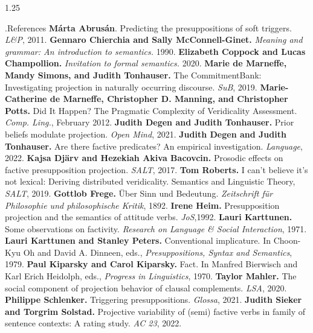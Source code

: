 \documentclass[final, table]{beamer}
\newlength{\colwidth}
\begin{document}
\begin{frame}[t]
\begin{columns}[t]
\begin{column}{1.25\colwidth}
\begin{normalbox}{\phantom.\hfill References}
				\textbf{Márta Abrusán}. Predicting the presuppositions of soft triggers. \textit{L\&P}, 2011.\quad\textbullet\quad
				\textbf{Gennaro Chierchia and Sally McConnell-Ginet.} \textit{Meaning and grammar: An introduction to semantics.} 1990.\quad\textbullet\quad
				\textbf{Elizabeth Coppock and Lucas Champollion.} \textit{Invitation to formal semantics.} 2020.\quad\textbullet\quad
				\textbf{Marie de Marneffe, Mandy Simons, and Judith Tonhauser.} The CommitmentBank: Investigating projection in naturally occurring discourse. \textit{SuB}, 2019.\quad\textbullet\quad
				\textbf{Marie-Catherine de Marneffe, Christopher D. Manning, and Christopher Potts.} Did It Happen? The Pragmatic Complexity of Veridicality Assessment. \textit{Comp. Ling.}, February 2012.\quad\textbullet\quad
				\textbf{Judith Degen and Judith Tonhauser.} Prior beliefs modulate projection. \textit{Open Mind}, 2021.\quad\textbullet\quad
				\textbf{Judith Degen and Judith Tonhauser.} Are there factive predicates? An empirical investigation. \textit{Language}, 2022.\quad\textbullet\quad
				\textbf{Kajsa Djärv and Hezekiah Akiva Bacovcin.} Prosodic effects on factive presupposition projection. \textit{SALT}, 2017.\quad\textbullet\quad
				\textbf{Tom Roberts.} I can’t believe it’s not lexical: Deriving distributed veridicality. Semantics and Linguistic Theory, \textit{SALT}, 2019.\quad\textbullet\quad
				\textbf{Gottlob Frege.} Über Sinn und Bedeutung. \textit{Zeitschrift für Philosophie und philosophische Kritik}, 1892.\quad\textbullet\quad
				\textbf{Irene Heim.} Presupposition projection and the semantics of attitude verbs. \textit{JoS},1992.\quad\textbullet\quad
				\textbf{Lauri Karttunen.} Some observations on factivity. \textit{Research on Language \& Social Interaction}, 1971.\quad\textbullet\quad
				\textbf{Lauri Karttunen and Stanley Peters.} Conventional implicature. In Choon-Kyu Oh and David A. Dinneen, eds., \textit{Presuppositions, Syntax and Semantics}, 1979.\quad\textbullet\quad
				\textbf{Paul Kiparsky and Carol Kiparsky.} Fact. In Manfred Bierwisch and Karl Erich Heidolph, eds., \textit{Progress in Linguistics}, 1970.\quad\textbullet\quad
				\textbf{Taylor Mahler.} The social component of projection behavior of clausal complements. \textit{LSA}, 2020.\quad\textbullet\quad
				\textbf{Philippe Schlenker.} Triggering presuppositions. \textit{Glossa}, 2021.\quad\textbullet\quad
				\textbf{Judith Sieker and Torgrim Solstad.} Projective variability of (semi) factive verbs in family of sentence contexts: A rating study. \textit{AC 23}, 2022.\quad\textbullet\quad

\end{normalbox}
\end{column}
\end{columns}
\end{frame}
\end{document}
